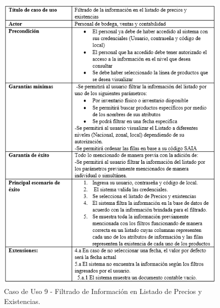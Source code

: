 \documentclass{scrreprt}
\begin{document}
\begin{figure}[!htpb]
    \centerline{\includegraphics[scale=.90]{images/case_stiff/stuff9.png}}
    \caption{Caso de Uso 9 - Filtrado de Información en Listado de Precios y Existencias.}
    \label{fig}
\end{figure}
\FloatBarrier
\end{document}
